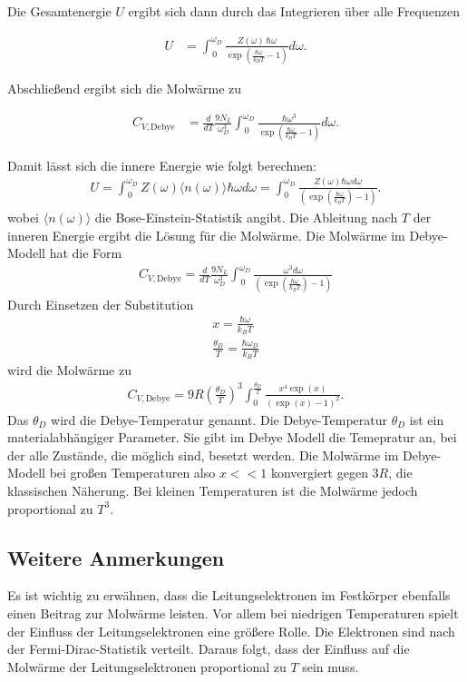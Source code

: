 Die Gesamtenergie $U$ ergibt sich dann durch das Integrieren über alle Frequenzen

\begin{align}
    \label{eqn:udebye}
    U &= \int_{\, 0}^{\omega_D} \frac{Z(\omega) \, \hbar \omega}{\exp \left( \frac{\hbar \omega}{k_B T} - 1 \right)} d\omega.
\end{align}

Abschließend ergibt sich die Molwärme zu 

\begin{align}
    C_{V, \text{Debye}} &= \frac{d}{d T} \frac{9 N_L}{\omega_D^3} \int_{\, 0}^{\omega_D} \frac{\hbar \omega^3}{\exp \left(\frac{\hbar \omega}{k_B T} -1 \right)} d \omega.
\end{align}

Damit lässt sich die innere Energie wie folgt berechnen:
\begin{align}
    U =  \int_{\, 0}^{\omega_D} Z(\omega) \langle n(\omega)\rangle \hbar \omega d \omega=  \int_0^{\omega_D} \frac{Z(\omega) \hbar \omega d \omega}{\left(\exp \left(\frac{\hbar \omega}{k_B T}\right) -1 \right)}.
\end{align}
wobei $\langle n(\omega)\rangle$ die Bose-Einstein-Statistik angibt. Die Ableitung nach $T$ der inneren Energie ergibt die Lösung für die Molwärme. Die Molwärme im Debye-Modell hat die Form
\begin{align}
    C_{V,\text{Debye}}= \frac{d}{d T}\frac{9 N_L}{\omega_D^3} \int_{\, 0}^{\omega_D} \frac{\omega^3 d\omega}{\left(\exp \left(\frac{\hbar \omega}{k_B T}\right) -1 \right)}
\end{align}
Durch Einsetzen der Substitution 
\begin{align}
    \label{eqn:debyesubst}
    x = \frac{\hbar \omega}{k_B T} \\  \frac{\theta_D}{T} = \frac{\hbar \omega_D}{ k_B T}
\end{align}
wird die Molwärme zu
\begin{align}
    C_{V,\text{Debye}} = 9 R \left(\frac{\theta_D}{T}\right)^3 \int_0^{\frac{\theta_D}{T}} \frac{x^4 \exp \left(x\right)}{ \left(\exp(x) -1\right)^2}.
\end{align}
Das $\theta_D$ wird die Debye-Temperatur genannt. Die Debye-Temperatur $\theta_D$ ist ein materialabhängiger Parameter. Sie gibt im Debye Modell die Temepratur an, bei der alle Zustände, die möglich sind, besetzt werden. Die Molwärme im Debye-Modell bei großen Temperaturen also $x<<1$ konvergiert gegen $3 R$, die klassischen Näherung. Bei kleinen Temperaturen ist die Molwärme 
jedoch proportional zu $T^3$. 
\subsection{Weitere Anmerkungen}
Es ist wichtig zu erwähnen, dass die Leitungselektronen im Festkörper ebenfalls einen Beitrag zur Molwärme leisten. Vor allem bei niedrigen Temperaturen spielt der Einfluss der Leitungselektronen eine größere Rolle. 
Die Elektronen sind nach der Fermi-Dirac-Statistik verteilt. Daraus folgt, dass der Einfluss auf die Molwärme der Leitungselektronen proportional zu $T$ sein muss. \\
